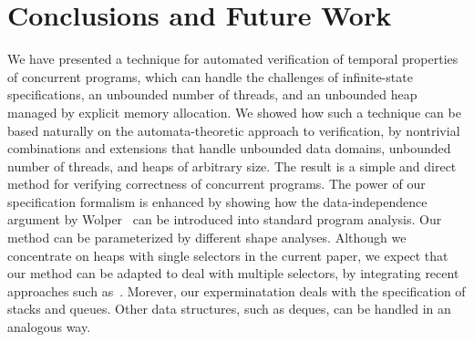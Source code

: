 \section{Conclusions and Future Work}
\label{sec:conclusion}

We have presented  a technique for automated verification of temporal
properties of concurrent programs, which can handle the challenges
of infinite-state specifications, an unbounded number of threads, and
an unbounded heap managed by explicit memory allocation.
We showed how such a technique
can be based naturally on the automata-theoretic approach to verification,
by nontrivial combinations and extensions that handle unbounded
data domains, unbounded number of threads, and heaps of arbitrary size. 
The result is a simple and direct method for verifying
correctness of concurrent programs.
The power of our specification
formalism is enhanced by showing how
the data-independence argument by Wolper~\cite{Wolper:dataindependence} can
be introduced into standard program analysis. 
%
Our method can be parameterized by different shape analyses.
Although we concentrate on heaps with single selectors in the current
paper, we expect that our method can be adapted to deal with multiple
selectors, by integrating recent approaches such as~\cite{habermehl:forest}. %
Morever, our experminatation deals with the specification of stacks and queues.
Other data structures, such as deques, can be handled in an analogous way.

